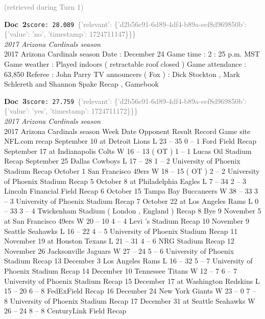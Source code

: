 \documentclass[a4paper,11pt]{article}
\begin{document}
\hfill{\tiny\textcolor{gray}{(retrieved during Turn 1)}}
\begin{docenv}
{\footnotesize\textcolor{doccolor}{\textbf{Doc~2}}}\hfill{\tiny\texttt{score:~28.089}}\ {\tiny\textcolor{gray}{\{'relevant': \{'d2b56e91-6d89-4df4-b89a-eef8d969850b': \{'value': 'no', 'timestamp': 1724711147\}\}\}}}\\[3pt]
{\small\textit{2017 Arizona Cardinals season}}\\[2pt]
\vspace{2pt}
{\footnotesize 2017 Arizona Cardinals season
Date : December 24 Game time : 2 : 25 p.m. MST Game weather : Played indoors ( retractable roof closed ) Game attendance : 63,850 Referee : John Parry TV announcers ( Fox ) : Dick Stockton , Mark Schlereth and Shannon Spake Recap , Gamebook}
\end{docenv}
\begin{docenv}
{\footnotesize\textcolor{doccolor}{\textbf{Doc~3}}}\hfill{\tiny\texttt{score:~27.759}}\ {\tiny\textcolor{gray}{\{'relevant': \{'d2b56e91-6d89-4df4-b89a-eef8d969850b': \{'value': 'yes', 'timestamp': 1724711172\}\}\}}}\\[3pt]
{\small\textit{2017 Arizona Cardinals season}}\\[2pt]
\vspace{2pt}
{\footnotesize 2017 Arizona Cardinals season
Week Date Opponent Result Record Game site NFL.com recap September 10 at Detroit Lions L 23 -- 35 0 -- 1 Ford Field Recap September 17 at Indianapolis Colts W 16 -- 13 ( OT ) 1 -- 1 Lucas Oil Stadium Recap September 25 Dallas Cowboys L 17 -- 28 1 -- 2 University of Phoenix Stadium Recap October 1 San Francisco 49ers W 18 -- 15 ( OT ) 2 -- 2 University of Phoenix Stadium Recap 5 October 8 at Philadelphia Eagles L 7 -- 34 2 -- 3 Lincoln Financial Field Recap 6 October 15 Tampa Bay Buccaneers W 38 -- 33 3 -- 3 University of Phoenix Stadium Recap 7 October 22 at Los Angeles Rams L 0 -- 33 3 -- 4 Twickenham Stadium ( London , England ) Recap 8 Bye 9 November 5 at San Francisco 49ers W 20 -- 10 4 -- 4 Levi 's Stadium Recap 10 November 9 Seattle Seahawks L 16 -- 22 4 -- 5 University of Phoenix Stadium Recap 11 November 19 at Houston Texans L 21 -- 31 4 -- 6 NRG Stadium Recap 12 November 26 Jacksonville Jaguars W 27 -- 24 5 -- 6 University of Phoenix Stadium Recap 13 December 3 Los Angeles Rams L 16 -- 32 5 -- 7 University of Phoenix Stadium Recap 14 December 10 Tennessee Titans W 12 -- 7 6 -- 7 University of Phoenix Stadium Recap 15 December 17 at Washington Redskins L 15 -- 20 6 -- 8 FedExField Recap 16 December 24 New York Giants W 23 -- 0 7 -- 8 University of Phoenix Stadium Recap 17 December 31 at Seattle Seahawks W 26 -- 24 8 -- 8 CenturyLink Field Recap}
\end{docenv}
\end{document}
